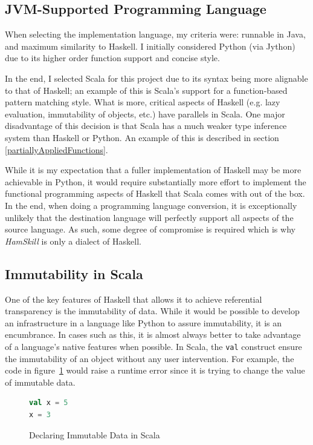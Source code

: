 \documentclass{report}
\begin{document}
\subsection{JVM-Supported Programming Language}

When selecting the implementation language, my criteria were: runnable in Java, and maximum similarity to Haskell.  I initially considered Python (via Jython) due to its higher order function support and concise style.  

In the end, I selected Scala for this project due to its syntax being more alignable to that of Haskell; an example of this is Scala's support for a function-based pattern matching style.  What is more, critical aspects of Haskell (e.g. lazy evaluation, immutability of objects, etc.) have parallels in Scala.  One major disadvantage of this decision is that Scala has a much weaker type inference system than Haskell or Python.  An example of this is described in section \ref{partiallyAppliedFunctions}.  

While it is my expectation that a fuller implementation of Haskell may be more achievable in Python, it would require substantially more effort to implement the functional programming aspects of Haskell that Scala comes with out of the box.  In the end, when doing a programming language conversion, it is exceptionally unlikely that the destination language will perfectly support all aspects of the source language.  As such, some degree of compromise is required which is why \emph{HamSkill} is only a dialect of Haskell.


\subsection{Immutability in Scala}\label{sec:immutabilityScala}

One of the key features of Haskell that allows it to achieve referential transparency is the immutability of data.  While it would be possible to develop an infrastructure in a language like Python to assure immutability, it is an encumbrance.  In cases such as this, it is almost always better to take advantage of a language's native features when possible.  In Scala, the {\tt val} construct ensure the immutability of an object without any user intervention.  For example, the code in figure~\ref{fig:scalaValConstruct} would raise a runtime error since it is trying to change the value of immutable data.

\begin{figure}[H]
\begin{mdframed}
\begin{lstlisting}[language=Scala]
val x = 5
x = 3
\end{lstlisting}
\end{mdframed}
\caption{Declaring Immutable Data in Scala}\label{fig:scalaValConstruct}
\end{figure}
\end{document}
